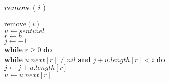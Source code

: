 \documentclass{beamer}
\begin{document}
\begin{frame}[shrink]
\frametitle{$remove(i)$}
\begin{oframed}
\begin{flushleft}
\hspace*{1em} \ensuremath{\mathrm{remove}(\ensuremath{\mathit{i}})}\\

\hspace*{1em} \hspace*{1em} \ensuremath{\ensuremath{\mathit{u}} \gets  \ensuremath{sentinel}}\\
\hspace*{1em} \hspace*{1em} \ensuremath{\ensuremath{\mathit{r}} \gets  \ensuremath{h}}\\
\hspace*{1em} \hspace*{1em} \ensuremath{\ensuremath{\mathit{j}} \gets  \ensuremath{-1}}\\
\hspace*{1em} \hspace*{1em} {\color{black} \textbf{while}} \ensuremath{\ensuremath{\mathit{r}} \ge 0} {\color{black} \textbf{do}} \\
\hspace*{1em} \hspace*{1em} \hspace*{1em} {\color{black} \textbf{while}} \ensuremath{\ensuremath{\mathit{u}}.\ensuremath{\mathit{next}}[\ensuremath{\mathit{r}}] \ne nil} {\color{black} \textbf{and}} \ensuremath{\ensuremath{\mathit{j}} + \ensuremath{\mathit{u}}.\ensuremath{\mathit{length}}[\ensuremath{\mathit{r}}] < i} {\color{black} \textbf{do}} \\
\hspace*{1em} \hspace*{1em} \hspace*{1em} \hspace*{1em} \ensuremath{\ensuremath{\mathit{j}} \gets  \ensuremath{\ensuremath{\mathit{j}} + \ensuremath{\mathit{u}}.\ensuremath{\mathit{length}}[\ensuremath{\mathit{r}}]}}\\
\hspace*{1em} \hspace*{1em} \hspace*{1em} \hspace*{1em} \ensuremath{\ensuremath{\mathit{u}} \gets  \ensuremath{\ensuremath{\mathit{u}}.\ensuremath{\mathit{next}}[\ensuremath{\mathit{r}}]}}\\

\end{flushleft}
\end{oframed}
\end{frame}
\end{document}

